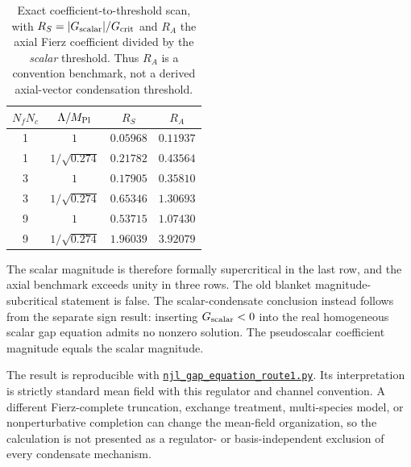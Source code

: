 \documentclass[aps,prd,twocolumn,superscriptaddress,showpacs,preprintnumbers,nofootinbib,longbibliography,floatfix]{revtex4-2}
\newcommand{\artifactnamed}[2]{\href{https://github.com/Hubify-Projects/bigbounce/blob/main/#1}{\nolinkurl{#2}}}
\begin{document}
\begin{table}[tb]
\caption{Exact coefficient-to-threshold scan, with
$R_S=|G_{\rm scalar}|/G_{\rm crit}$ and $R_A$ the axial Fierz coefficient
divided by the \emph{scalar} threshold.  Thus $R_A$ is a convention benchmark,
not a derived axial-vector condensation threshold.}
\begin{ruledtabular}
\begin{tabular}{cccc}
$N_fN_c$ & $\Lambda/M_{\rm Pl}$ & $R_S$ & $R_A$ \\
\hline
1 & $1$ & $0.05968$ & $0.11937$ \\
1 & $1/\sqrt{0.274}$ & $0.21782$ & $0.43564$ \\
3 & $1$ & $0.17905$ & $0.35810$ \\
3 & $1/\sqrt{0.274}$ & $0.65346$ & $1.30693$ \\
9 & $1$ & $0.53715$ & $1.07430$ \\
9 & $1/\sqrt{0.274}$ & $1.96039$ & $3.92079$ \\
\end{tabular}
\end{ruledtabular}
\end{table}

The scalar magnitude is therefore formally supercritical in the last row,
and the axial benchmark exceeds unity in three rows.  The old blanket
magnitude-subcritical statement is false.  The scalar-condensate conclusion
instead follows from the separate sign result: inserting
$G_{\rm scalar}<0$ into the real homogeneous scalar gap equation admits no
nonzero solution.  The pseudoscalar coefficient magnitude equals the scalar
magnitude.

The result is reproducible with
\artifactnamed{arxiv/scripts/njl_gap_equation_route1.py}{njl_gap_equation_route1.py}.  Its interpretation is
strictly standard mean field with this regulator and channel convention.  A
different Fierz-complete truncation, exchange treatment, multi-species model,
or nonperturbative completion can change the mean-field organization, so the
calculation is not presented as a regulator- or basis-independent exclusion
of every condensate mechanism.
\end{document}
